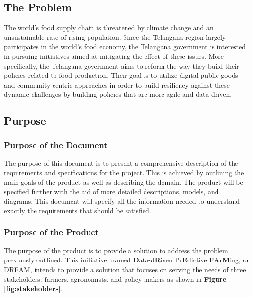 \setcounter{goals_counter}{1}
\subsection{The Problem}
\begin{flushleft}
The world's food supply chain is threatened by climate change and an unsustainable rate of rising population. Since the Telangana region largely participates in the world's food economy, the Telangana government is interested in pursuing initiatives aimed at mitigating the effect of these issues. More specifically, the Telangana government aims to reform the way they build their policies related to food production. Their goal is to utilize digital public goods and community-centric approaches in order to build resiliency against these dynamic challenges by building policies that are more agile and data-driven. 
\end{flushleft}
\subsection{Purpose}
\subsubsection{Purpose of the Document}
\begin{flushleft}
The purpose of this document is to present a comprehensive description of the requirements and specifications for the project. This is achieved by outlining the main goals of the product as well as describing the domain. The product will be specified further with the aid of more detailed descriptions, models, and diagrams. This document will specify all the information needed to understand exactly the requirements that should be satisfied. 
\end{flushleft} 

\subsubsection{Purpose of the Product}
The purpose of the product is to provide a solution to address the problem previously outlined. 
This initiative, named {\bf D}ata-d{\bf R}iven Pr{\bf E}dictive F{\bf A}r{\bf M}ing, or DREAM, intends to provide a solution that focuses on serving the needs of three stakeholders: farmers, agronomists, and policy makers as shown in \textbf{Figure \ref{fig:stakeholders}}.


